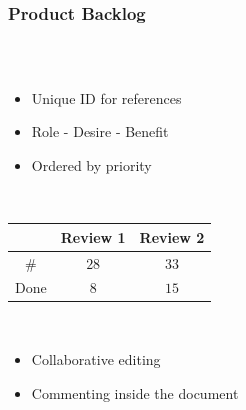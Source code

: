 \begin{frame}
  \frametitle{Product Backlog}
  \begin{columns}
    \begin{column}{0.52\textwidth}
      \begin{description}[]
        \item[Structure] \hfill \\
        \begin{itemize}
          \item Unique ID for references
          \item Role - Desire - Benefit
          \item Ordered by priority
        \end{itemize}
        
        \bigskip
        \item[Progress] \hfill \\
        \begin{tabular}{c | c | c}
           & Review 1 & Review 2\\
          \hline
          $\#$ & $28$ & $33$\\
          Done   & $8$  & $15$        
        \end{tabular}
        
        \bigskip
        \item[Tool: Google Spreadsheet] \hfill \\
        \begin{itemize}
          \item Collaborative editing
          \item Commenting inside the document
        \end{itemize}
      \end{description}
    \end{column}


\end{columns}
\end{frame}
